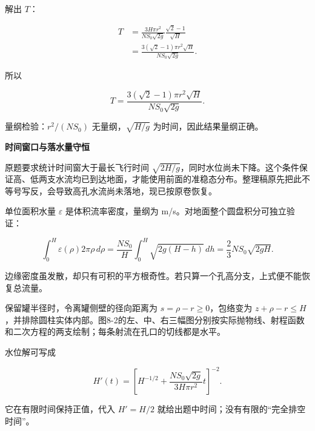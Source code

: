 \documentclass[12pt,a4paper,UTF8]{ctexart}
\begin{document}
解出 \(T\)：

\[\begin{aligned}
T
&=\frac{3H\pi r^2}{NS_0\sqrt{2g}}
\frac{\sqrt2-1}{\sqrt H}\\
&=\frac{3(\sqrt2-1)\pi r^2\sqrt H}
{NS_0\sqrt{2g}}.
\end{aligned}\]

所以

\[\boxed{
T=
\frac{3(\sqrt2-1)\pi r^2\sqrt H}
{NS_0\sqrt{2g}}
}.\]

量纲检验：\(r^2/(NS_0)\) 无量纲，\(\sqrt{H/g}\)
为时间，因此结果量纲正确。

\textbf{时间窗口与落水量守恒}

原题要求统计时间窗大于最长飞行时间
\(\sqrt{2H/g}\)，同时水位尚未下降。这个条件保证高、低两支水流均已到达地面，才能使用前面的准稳态分布。整理稿原先把此不等号写反，会导致高孔水流尚未落地，现已按原卷恢复。

单位面积水量 \(\varepsilon\) 是体积流率密度，量纲为
m/s。对地面整个圆盘积分可独立验证：

\[\int_0^H\varepsilon(\rho)2\pi\rho\,d\rho
=\frac{NS_0}{H}\int_0^H\sqrt{2g(H-h)}\,dh
=\frac23NS_0\sqrt{2gH}.\]

边缘密度虽发散，却只有可积的平方根奇性。若只算一个孔高分支，上式便不能恢复总流量。

保留罐半径时，令离罐侧壁的径向距离为 \(s=\rho-r\ge0\)，包络变为
\(z+\rho-r\le H\)，并排除圆柱实体内部。图8-2的左、中、右三幅图分别按实际抛物线、射程函数和二次方程的两支绘制；每条射流在孔口的切线都是水平。

水位解可写成

\[H'(t)=\left[H^{-1/2}+\frac{NS_0\sqrt{2g}}{3H\pi r^2}t\right]^{-2}.\]

它在有限时间保持正值，代入 \(H'=H/2\)
就给出题中时间；没有有限的``完全排空时间''。
\end{document}
